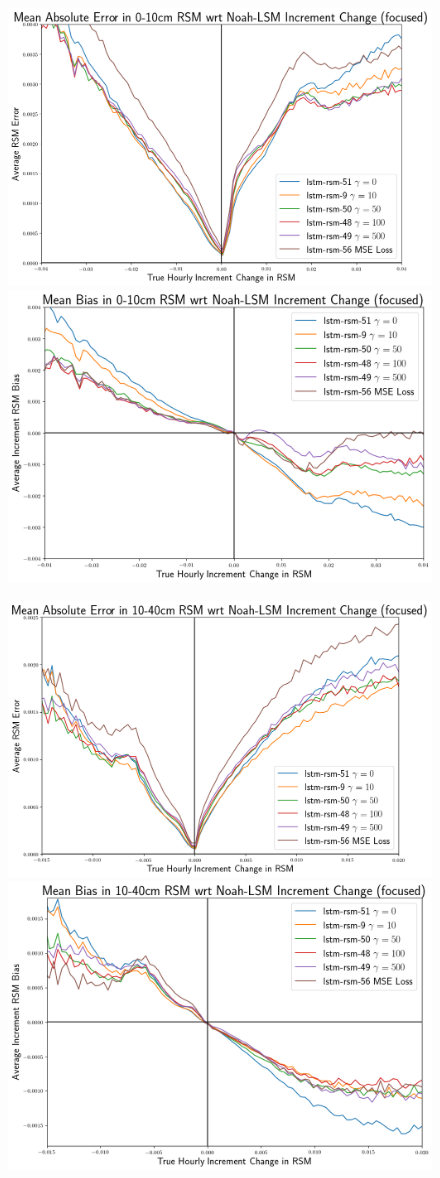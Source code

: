 \begin{figure}[hp!]
    \centering
    \includegraphics[width=.50\linewidth,draft=false]{figures/error-wrt-increment-change/eval_test_rsm-10_increment-error-1d-focus_abs-err.png}
    \includegraphics[width=.48\linewidth,draft=false]{figures/error-wrt-increment-change/eval_test_rsm-10_increment-error-1d-focus_bias.png}

    \includegraphics[width=.50\linewidth,draft=false]{figures/error-wrt-increment-change/eval_test_rsm-40_increment-error-1d-focus_abs-err.png}
    \includegraphics[width=.48\linewidth,draft=false]{figures/error-wrt-increment-change/eval_test_rsm-40_increment-error-1d-focus_bias.png}


\end{figure}
